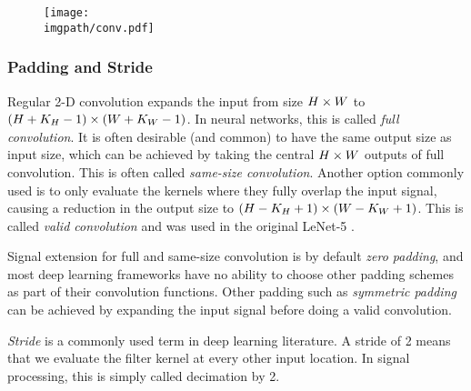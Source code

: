 \begin{figure}
  \centering
  \texttt{[image: \\imgpath/conv.pdf]}
  \label{fig:ch2:conv_layer}
\end{figure}

\subsubsection{Padding and Stride}\label{sec:ch2:padding}
Regular 2-D convolution expands the input from size $H\times W$ to $(H+K_H-1)\times
(W+K_W-1)$. In neural networks, this is called \emph{full convolution}.
It is often desirable (and common) to
have the same output size as input size, which can be achieved by
taking the central $H\times W$ outputs of full convolution. This is often
called \emph{same-size convolution}.
Another option commonly used is to only evaluate the kernels where they fully
overlap the input signal, causing a reduction in the output size to $(H-K_H+1)
\times (W-K_W+1)$. This is called \emph{valid convolution} and was used in the
original LeNet-5 \cite{lecun_gradient-based_1998}.

Signal extension for full and same-size convolution is by default \emph{zero
padding}, and most deep learning frameworks have no ability to choose other
padding schemes as part of their convolution functions. Other padding such as
\emph{symmetric padding} can be achieved by expanding the input signal before
doing a valid convolution.

\emph{Stride} is a commonly used term in deep learning literature. A stride of 2 means
that we evaluate the filter kernel at every other input location. In signal
processing, this is simply called decimation by 2.

